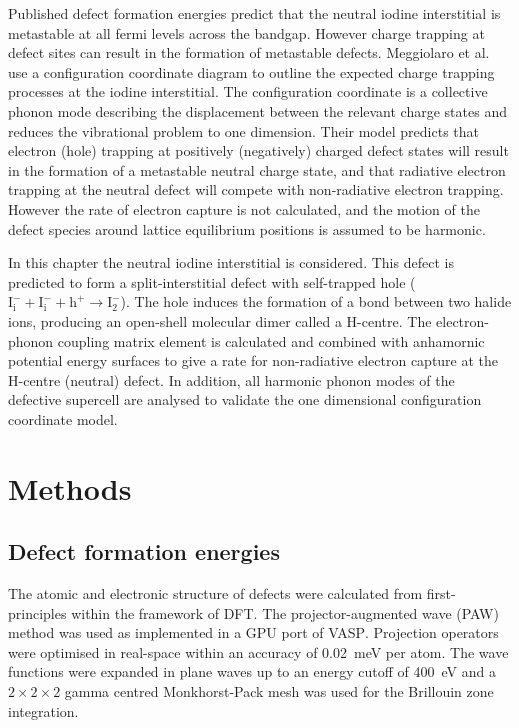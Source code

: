 Published defect formation energies predict that the neutral iodine interstitial is metastable at all fermi levels across the bandgap.
However charge trapping at defect sites can result in the formation of metastable defects.
Meggiolaro et al.\autocite{} use a configuration coordinate diagram to outline the expected charge trapping processes at the iodine interstitial. 
The configuration coordinate is a collective phonon mode describing the displacement between the relevant charge states and reduces the vibrational problem to one dimension.
Their model predicts that electron (hole) trapping at positively (negatively) charged defect states will result in the formation of a metastable neutral charge state, and that radiative electron trapping at the neutral defect will compete with non-radiative electron trapping.
However the rate of electron capture is not calculated, and the motion of the defect species around lattice equilibrium positions is assumed to be harmonic.

In this chapter the neutral iodine interstitial is considered. This defect is predicted to form a split-interstitial defect with self-trapped hole ($\mathrm{I}_\mathrm{i}^-+\mathrm{I}_\mathrm{i}^-+\mathrm{h}^+ \rightarrow \mathrm{I}_\mathrm{2}^-$). The hole induces the formation of a bond between two halide ions, producing an open-shell molecular dimer called a H-centre.
The electron-phonon coupling matrix element is calculated and combined with anhamornic potential energy surfaces to give a rate for non-radiative electron capture at the H-centre (neutral) defect. In addition, all harmonic phonon modes of the defective supercell are analysed to validate the one dimensional configuration coordinate model.





\section{Methods}

\subsection{Defect formation energies} \label{method:dfe}

The atomic and electronic structure of defects were calculated from first-principles within the framework of DFT. The projector-augmented wave (PAW) method\autocite{Blochl1994} was used as implemented in a GPU port of \textsc{VASP}.\autocite{Kresse1996a} Projection operators were optimised in real-space within an accuracy of \SI{0.02}{\milli\electronvolt} per atom. The wave functions were expanded in plane waves up to an energy cutoff of \SI{400}{\electronvolt} and a $2\! \times\! 2\! \times\! 2$ gamma centred Monkhorst-Pack mesh was used for the Brillouin zone integration.


